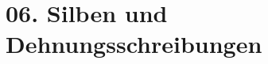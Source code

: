 \documentclass[handout,aspectratio=1610,dvipsnames]{beamer}
\begin{document}
  \section[Silben\slash Dehnung]{06. Silben und Dehnungsschreibungen}
  \let\woopsi\section\let\section\subsection\let\subsection\subsubsection
  
  \let\subsection\section\let\section\woopsi
  
\end{document}

